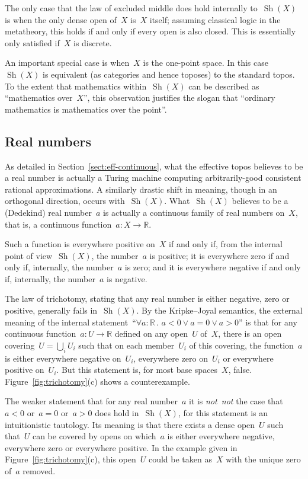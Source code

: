 \documentclass[oneside,reqno]{amsart}
\theoremstyle{definition}
\theoremstyle{plain}
\theoremstyle{remark}
\newcommand{\RR}{\mathbb{R}}
\DeclareMathOperator{\Sh}{Sh}
\renewcommand{\_}{\mathpunct{.}\,}
\newcommand{\effective}{ef{}fective\xspace}
\newcommand{\?}{\,{:}\,}
\newcommand{\notnot}{\emph{not~not}\xspace}
\begin{document}
The only case that the law of excluded middle does hold internally to~$\Sh(X)$
is when the only dense open of~$X$ is~$X$ itself; assuming classical logic in
the metatheory, this holds if and only if every open is also closed. This is
essentially only satisfied if~$X$ is discrete.

An important special case is when~$X$ is the one-point space. In this
case~$\Sh(X)$ is equivalent (as categories and hence toposes) to the standard
topos. To the extent that mathematics within~$\Sh(X)$ can be described as ``mathematics
over~$X$'', this observation justifies the slogan that ``ordinary mathematics
is mathematics over the point''.


\subsection{Real numbers}
As detailed in Section~\ref{sect:eff-continuous}, what the \effective topos believes to be a real number is
actually a Turing machine computing arbitrarily-good consistent rational
approximations. A similarly drastic shift in meaning, though in an orthogonal
direction, occurs with~$\Sh(X)$. What~$\Sh(X)$ believes to be a (Dedekind) real
number~$a$ is actually a continuous family of real numbers on~$X$, that is, a
continuous function~$a : X \to \RR$.

Such a function is everywhere positive on~$X$ if and only if, from the internal point of
view~$\Sh(X)$, the number~$a$ is positive; it is everywhere zero if and only
if, internally, the number~$a$ is zero; and it is everywhere negative if and
only if, internally, the number~$a$ is negative.

The law of trichotomy, stating that any real number is either negative, zero or
positive, generally fails in~$\Sh(X)$. By the Kripke--Joyal semantics, the external
meaning of the internal statement~``$\forall a:\RR\_ a<0 \vee a=0 \vee a>0$'' is that for any continuous function~$a : U
\to \RR$ defined on any open~$U$ of~$X$, there is an open covering~$U =
\bigcup_i U_i$ such that on each member~$U_i$ of this covering, the function~$a$ is
either everywhere negative on~$U_i$, everywhere zero on~$U_i$ or everywhere
positive on~$U_i$. But this statement is, for most base spaces~$X$, false.
Figure~\ref{fig:trichotomy}(c) shows a counterexample.

The weaker statement that for any real number~$a$ it is \notnot the case that~$a < 0$
or~$a = 0$ or~$a > 0$ does hold in~$\Sh(X)$, for this statement is an
intuitionistic tautology. Its meaning is that there exists a
dense open~$U$ such that~$U$ can be covered by opens on which~$a$ is either
everywhere negative, everywhere zero or everywhere positive. In the example
given in Figure~\ref{fig:trichotomy}(c), this open~$U$ could be taken as~$X$
with the unique zero of~$a$ removed.
\end{document}

